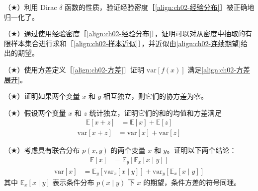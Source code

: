 \documentclass[../../main.tex]{subfiles}
\begin{document}
\begin{exercise}\label{exercise:ch02-06}
（$\bigstar$）利用 Dirac $\delta$ 函数的性质，验证经验密度［\eqref{align:ch02-经验分布}］被正确地归一化了。
\end{exercise}

\begin{exercise}\label{exercise:ch02-07}
（$\bigstar$）通过使用经验密度［\eqref{align:ch02-经验分布}］，证明可以对从密度中抽取的有限样本集合进行求和［\eqref{align:ch02-样本近似}］，并近似由\eqref{align:ch02-连续期望}给出的期望。
\end{exercise}

\begin{exercise}\label{exercise:ch02-08}
（$\bigstar$）使用方差定义［\eqref{align:ch02-方差}］证明 $\mathrm{var}[f(x)]$ 满足\eqref{align:ch02-方差展开}。
\end{exercise}

\begin{exercise}\label{exercise:ch02-09}
（$\bigstar$）证明如果两个变量 $x$ 和 $y$ 相互独立，则它们的协方差为零。
\end{exercise}

\begin{exercise}\label{exercise:ch02-10}
（$\bigstar$）假设两个变量 $x$ 和 $z$ 统计独立，证明它们的和的均值和方差满足
\begin{align}
  \mathbb{E}[x+z] &= \mathbb{E}[x]+\mathbb{E}[z]
  \label{align:ch02-和均值}
\end{align}
\begin{align}
  \mathrm{var}[x+z] &= \mathrm{var}[x]+\mathrm{var}[z]
  \label{align:ch02-和方差}
\end{align}
\end{exercise}

\begin{exercise}\label{exercise:ch02-11}
（$\bigstar$）考虑具有联合分布 $p(x,y)$ 的两个变量 $x$ 和 $y$。证明以下两个结论：
\begin{align}
  \mathbb{E}[x] &= \mathbb{E}_{y}\left[\mathbb{E}_{x}[x\mid y]\right]
  \label{align:ch02-全期望}
\end{align}
\begin{align}
  \mathrm{var}[x] &= \mathbb{E}_{y}\left[\mathrm{var}_{x}[x\mid y]\right] + \mathrm{var}_{y}\left[\mathbb{E}_{x}[x\mid y]\right]
  \label{align:ch02-全方差}
\end{align}
其中 $\mathbb{E}_{x}[x\mid y]$ 表示条件分布 $p(x\mid y)$ 下 $x$ 的期望，条件方差的符号同理。
\end{exercise}
\end{document}
